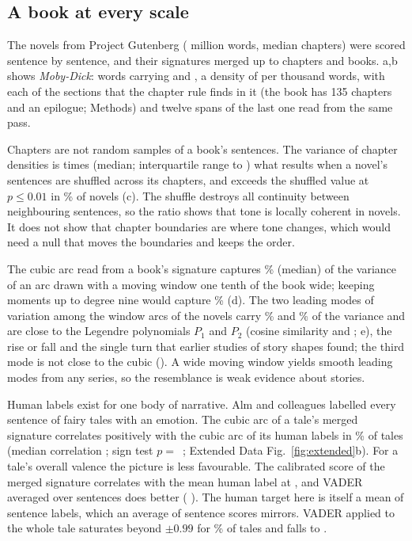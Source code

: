 \figDilution

\subsection{A book at every scale}

The \nNovels{} novels from Project Gutenberg (\novelWords{} million words, median \novelChapters{} chapters) were scored sentence by sentence, and their signatures merged up to chapters and books. a,b shows \emph{Moby-Dick}: \mobyWords{} words carrying \mobyHedons\hd{} and \mobyDolors\dl, a density of \mobyDensity{} per thousand words, with each of the \mobyChapters{} sections that the chapter rule finds in it (the book has 135 chapters and an epilogue; Methods) and twelve spans of the last one read from the same pass.

Chapters are not random samples of a book's sentences. The variance of chapter densities is \heteroMedian{} times (median; interquartile range \heteroLo{} to \heteroHi) what results when a novel's sentences are shuffled across its chapters, and exceeds the shuffled value at $p\leq0.01$ in \heteroSig\% of novels (c). The shuffle destroys all continuity between neighbouring sentences, so the ratio shows that tone is locally coherent in novels. It does not show that chapter boundaries are where tone changes, which would need a null that moves the boundaries and keeps the order.

The cubic arc read from a book's signature captures \arcShareThree\% (median) of the variance of an arc drawn with a moving window one tenth of the book wide; keeping moments up to degree nine would capture \arcShareNine\% (d). The two leading modes of variation among the window arcs of the \nNovels{} novels carry \svdVarOne\% and \svdVarSecond\% of the variance and are close to the Legendre polynomials $P_1$ and $P_2$ (cosine similarity \svdCosOne{} and \svdCosTwo; e), the rise or fall and the single turn that earlier studies of story shapes found\cite{reagan2016}; the third mode is not close to the cubic (\svdCosThree). A wide moving window yields smooth leading modes from any series, so the resemblance is weak evidence about stories.

Human labels exist for one body of narrative. Alm and colleagues labelled every sentence of \nTales{} fairy tales with an emotion\cite{alm2005}. The cubic arc of a tale's merged signature correlates positively with the cubic arc of its human labels in \taleArcPos\% of tales (median correlation \taleArc; sign test $p=$~\taleArcP; Extended Data Fig.~\ref{fig:extended}b). For a tale's overall valence the picture is less favourable. The calibrated score of the merged signature correlates with the mean human label at \taleStoryCal{} \taleStoryCalCI, and VADER averaged over sentences does better (\taleStoryVader{} \taleStoryVaderCI). The human target here is itself a mean of sentence labels, which an average of sentence scores mirrors. VADER applied to the whole tale saturates beyond $\pm0.99$ for \taleSaturated\% of tales and falls to \taleWholeVader.

